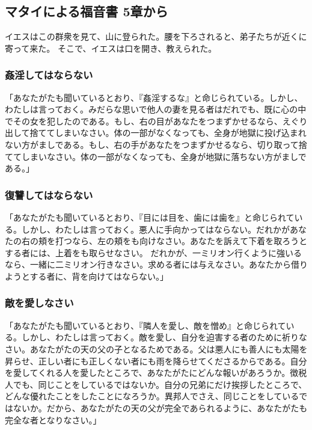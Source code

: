 \documentclass[uplatex,dvipdfmx]{jsarticle} \usepackage{mystyle}%
\begin{document}
\subsection*{マタイによる福音書 5章から}

イエスはこの群衆を見て、山に登られた。腰を下ろされると、弟子たちが近くに寄って来た。
そこで、イエスは口を開き、教えられた。


\subsubsection*{姦淫してはならない}



「あなたがたも聞いているとおり、『姦淫するな』と命じられている。しかし、わたしは言っておく。みだらな思いで他人の妻を見る者はだれでも、既に心の中でその女を犯したのである。もし、右の目があなたをつまずかせるなら、えぐり出して捨ててしまいなさい。体の一部がなくなっても、全身が地獄に投げ込まれない方がましである。もし、右の手があなたをつまずかせるなら、切り取って捨ててしまいなさい。体の一部がなくなっても、全身が地獄に落ちない方がましである。」

\subsubsection*{復讐してはならない}

「あなたがたも聞いているとおり、『目には目を、歯には歯を』と命じられている。しかし、わたしは言っておく。悪人に手向かってはならない。だれかがあなたの右の頬を打つなら、左の頬をも向けなさい。あなたを訴えて下着を取ろうとする者には、上着をも取らせなさい。 だれかが、一ミリオン行くように強いるなら、一緒に二ミリオン行きなさい。求める者には与えなさい。あなたから借りようとする者に、背を向けてはならない。」

\subsubsection*{敵を愛しなさい}

「あなたがたも聞いているとおり、『隣人を愛し、敵を憎め』と命じられている。しかし、わたしは言っておく。敵を愛し、自分を迫害する者のために祈りなさい。あなたがたの天の父の子となるためである。父は悪人にも善人にも太陽を昇らせ、正しい者にも正しくない者にも雨を降らせてくださるからである。自分を愛してくれる人を愛したところで、あなたがたにどんな報いがあろうか。徴税人でも、同じことをしているではないか。自分の兄弟にだけ挨拶したところで、どんな優れたことをしたことになろうか。異邦人でさえ、同じことをしているではないか。だから、あなたがたの天の父が完全であられるように、あなたがたも完全な者となりなさい。」
\end{document}
